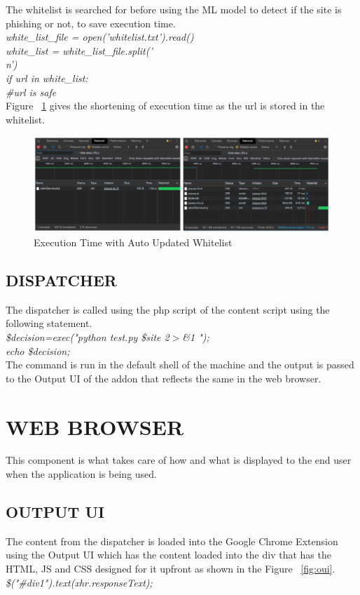 The whitelist is searched for before using the ML model to detect if the site is phishing or not, to save execution time.\\
\null\quad\textit{white\_list\_file = open('whitelist.txt').read()}\\
\null\quad\textit{white\_list = white\_list\_file.split('\\n')}\\
\null\quad\textit{if url in white\_list:}\\
\null\quad\textit{\#url is safe}\\

Figure  ~\ref{fig:etauw} gives the shortening of execution time as the url is stored in the whitelist.

\begin{figure}[htp]
\centering
\includegraphics[scale=0.5]{Figures/image12.png}
\caption{Execution Time with Auto Updated Whitelist}
\label{fig:etauw}
\end{figure}

\subsection{DISPATCHER}
The dispatcher is called using the php script of the content script using the following statement.\\
\null\quad\textit{\$decision=exec("python test.py \$site 2$>$\&1 ");}\\
\null\quad\textit{echo \$decision;}\\

The command is run in the default shell of the machine and the output is passed to the Output UI of the addon that reflects the same in the web browser.

\section{WEB BROWSER}
This component is what takes care of how and what is displayed to the end user when the application is being used.

\subsection{OUTPUT UI}
The content from the dispatcher is loaded into the Google Chrome Extension using the Output UI which has the content loaded into the div that has the HTML, JS and CSS designed for it upfront as shown in the Figure ~\ref{fig:oui}.\\
\null\quad\textit{\$("\#div1").text(xhr.responseText);}\\

